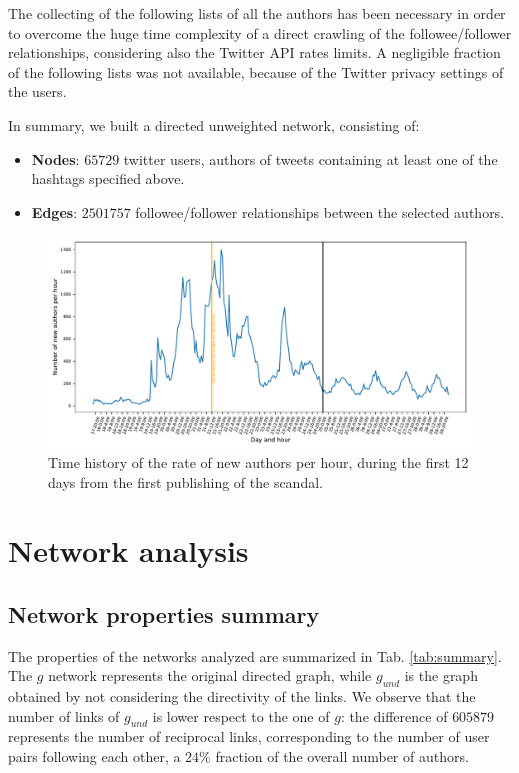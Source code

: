 \documentclass[11pt, twoside]{report}
\begin{document}
    The collecting of the following lists of all the authors has been necessary in order to overcome the huge time complexity of a direct crawling of the
    followee/follower relationships, considering also the Twitter API rates limits. A negligible fraction of the following lists was not available, because of the Twitter privacy settings of the users.

    In summary, we built a directed unweighted network, consisting of:

    \begin{itemize}
    \item \textbf{Nodes}: $65729$ twitter users, authors of tweets containing at least one of the hashtags specified above.

    \item \textbf{Edges}: $2501757$ followee/follower relationships between the selected authors.
    \end{itemize}


    \begin{figure}[htbp]
      \centering
\includegraphics[width=\textwidth]{../../scripts/network_analysis/imgs/time_history.pdf}
      \caption{Time history of the rate of new authors per hour, during the first 12 days from the first publishing of the scandal.}
      \label{fig:time_history}
    \end{figure}




    \chapter{Network analysis}
\section{Network properties summary}


The properties of the networks analyzed are summarized in Tab. \ref{tab:summary}. The $g$ network represents the original directed graph, while
$g_{und}$ is the graph obtained by not considering the directivity of the links. We observe that the number of links of $g_{und}$ is lower respect to the one of $g$: the difference of $605879$ represents the number of reciprocal links, corresponding to the number of user pairs following each other, a $24\%$ fraction of the overall number of authors.
\end{document}

